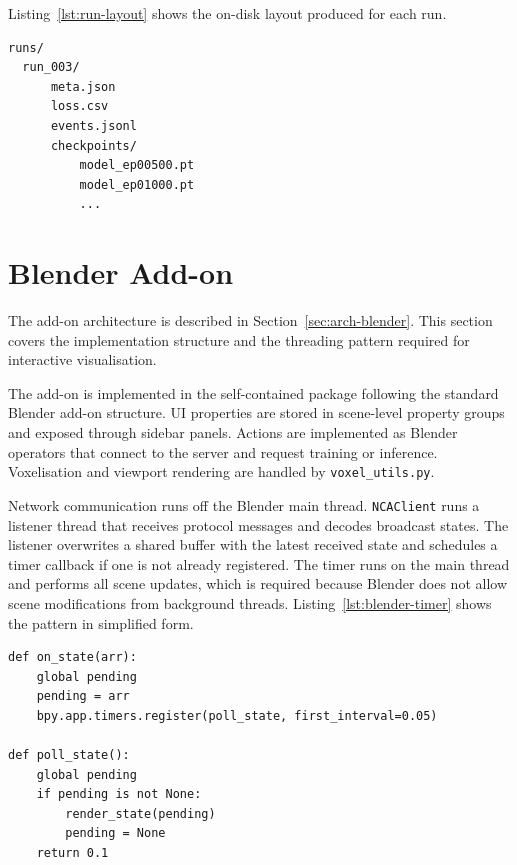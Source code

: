 Listing~\ref{lst:run-layout} shows the on-disk layout produced for each run.

\begin{lstlisting}[basicstyle=\ttfamily\footnotesize, numbers=none,
frame=single, breaklines=true, linewidth=0.92\textwidth,
xleftmargin=0.04\textwidth,
caption={Run directory layout produced by the training server.},
label={lst:run-layout}]
runs/
  run_003/
      meta.json
      loss.csv
      events.jsonl
      checkpoints/
          model_ep00500.pt
          model_ep01000.pt
          ...
\end{lstlisting}

\section{Blender Add-on}

The add-on architecture is described in Section~\ref{sec:arch-blender}. This
section covers the implementation structure and the threading pattern required
for interactive visualisation.

The add-on is implemented in the self-contained  package 
following the standard Blender add-on structure. UI properties are
stored in scene-level property groups and exposed through sidebar panels.
Actions are implemented as Blender operators that connect to the server and
request training or inference. Voxelisation and viewport rendering are handled
by \texttt{voxel\_utils.py}.

Network communication runs off the Blender main thread. \texttt{NCAClient}
runs a listener thread that receives protocol messages and decodes broadcast
states. The listener overwrites a shared buffer with the latest received state
and schedules a timer callback if one is not already registered. The timer
runs on the main thread and performs all scene updates, which is required
because Blender does not allow scene modifications from background threads.
Listing~\ref{lst:blender-timer} shows the pattern in simplified form.

\begin{lstlisting}[style=py, caption={State visualisation via a listener
thread and a main-thread timer (simplified).},
label={lst:blender-timer}]
def on_state(arr):
    global pending
    pending = arr
    bpy.app.timers.register(poll_state, first_interval=0.05)

def poll_state():
    global pending
    if pending is not None:
        render_state(pending)
        pending = None
    return 0.1
\end{lstlisting}

